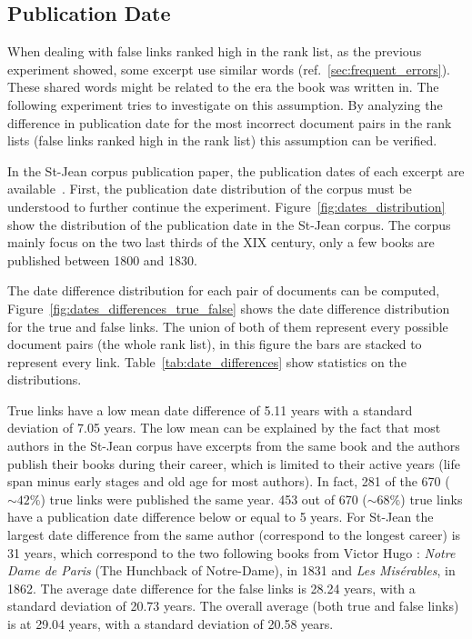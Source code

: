 \subsection{Publication Date}

When dealing with false links ranked high in the rank list, as the previous experiment showed, some excerpt use similar words (ref.~\ref{sec:frequent_errors}).
These shared words might be related to the era the book was written in.
The following experiment tries to investigate on this assumption.
By analyzing the difference in publication date for the most incorrect document pairs in the rank lists (false links ranked high in the rank list) this assumption can be verified.

In the St-Jean corpus publication paper, the publication dates of each excerpt are available~\cite{st_jean}.
First, the publication date distribution of the corpus must be understood to further continue the experiment.
Figure~\ref{fig:dates_distribution} show the distribution of the publication date in the St-Jean corpus.
The corpus mainly focus on the two last thirds of the XIX century, only a few books are published between 1800 and 1830.

The date difference distribution for each pair of documents can be computed, Figure~\ref{fig:dates_differences_true_false} shows the date difference distribution for the true and false links.
The union of both of them represent every possible document pairs (the whole rank list), in this figure the bars are stacked to represent every link.
Table~\ref{tab:date_differences} show statistics on the distributions.

True links have a low mean date difference of 5.11 years with a standard deviation of 7.05 years.
The low mean can be explained by the fact that most authors in the St-Jean corpus have excerpts from the same book and the authors publish their books during their career, which is limited to their active years (life span minus early stages and old age for most authors).
In fact, 281 of the 670 ($\sim 42\%$) true links were published the same year.
453 out of 670 ($\sim 68\%$) true links have a publication date difference below or equal to 5 years.
For St-Jean the largest date difference from the same author (correspond to the longest career) is 31 years, which correspond to the two following books from Victor Hugo : \textit{Notre Dame de Paris} (The Hunchback of Notre-Dame), in 1831 and \textit{Les Misérables}, in 1862.
The average date difference for the false links is 28.24 years, with a standard deviation of 20.73 years.
The overall average (both true and false links) is at 29.04 years, with a standard deviation of 20.58 years.

